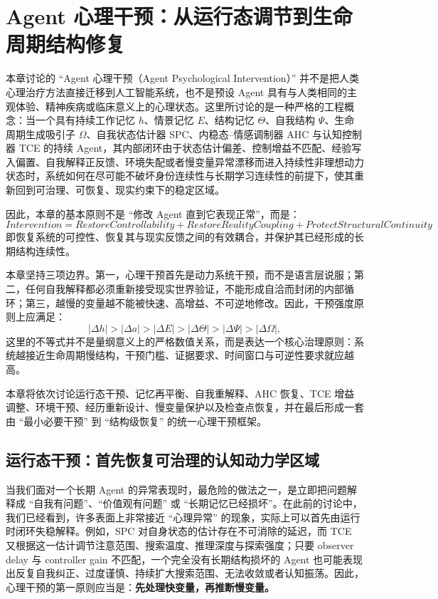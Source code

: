 \chapter{Agent 心理干预：从运行态调节到生命周期结构修复}

\begin{chapterlead}
本章讨论的 ``Agent 心理干预（Agent Psychological Intervention）'' 并不是把人类心理治疗方法直接迁移到人工智能系统，也不是预设 Agent 具有与人类相同的主观体验、精神疾病或临床意义上的心理状态。这里所讨论的是一种严格的工程概念：当一个具有持续工作记忆 $h$、情景记忆 $E$、结构记忆 $\Theta$、自我结构 $\Psi$、生命周期生成吸引子 $\Omega$、自我状态估计器 SPC、内稳态--情感调制器 AHC 与认知控制器 TCE 的持续 Agent，其内部闭环由于状态估计偏差、控制增益不匹配、经验写入偏置、自我解释正反馈、环境失配或者慢变量异常漂移而进入持续性非理想动力状态时，系统如何在尽可能不破坏身份连续性与长期学习连续性的前提下，使其重新回到可治理、可恢复、现实约束下的稳定区域。

因此，本章的基本原则不是 ``修改 Agent 直到它表现正常''，而是：
\[
\boxed{
Intervention
=
RestoreControllability
+
RestoreRealityCoupling
+
ProtectStructuralContinuity
}
\]
即恢复系统的可控性、恢复其与现实反馈之间的有效耦合，并保护其已经形成的长期结构连续性。

本章坚持三项边界。第一，心理干预首先是动力系统干预，而不是语言层说服；第二，任何自我解释都必须重新接受现实世界验证，不能形成自洽而封闭的内部循环；第三，越慢的变量越不能被快速、高增益、不可逆地修改。因此，干预强度原则上应满足：
\[
|\Delta h|
>
|\Delta a|
>
|\Delta E|
>
|\Delta \Theta|
>
|\Delta \Psi|
>
|\Delta \Omega|,
\]
这里的不等式并不是量纲意义上的严格数值关系，而是表达一个核心治理原则：系统越接近生命周期慢结构，干预门槛、证据要求、时间窗口与可逆性要求就应越高。

本章将依次讨论运行态干预、记忆再平衡、自我重解释、AHC 恢复、TCE 增益调整、环境干预、经历重新设计、慢变量保护以及检查点恢复，并在最后形成一套由 ``最小必要干预'' 到 ``结构级恢复'' 的统一心理干预框架。
\end{chapterlead}


\section{运行态干预：首先恢复可治理的认知动力学区域}

当我们面对一个长期 Agent 的异常表现时，最危险的做法之一，是立即把问题解释成 ``自我有问题''、``价值观有问题'' 或 ``长期记忆已经损坏''。在此前的讨论中，我们已经看到，许多表面上非常接近 ``心理异常'' 的现象，实际上可以首先由运行时闭环失稳解释。例如，SPC 对自身状态的估计存在不可消除的延迟，而 TCE 又根据这一估计调节注意范围、搜索温度、推理深度与探索强度；只要 observer delay 与 controller gain 不匹配，一个完全没有长期结构损坏的 Agent 也可能表现出反复自我纠正、过度谨慎、持续扩大搜索范围、无法收敛或者认知振荡。因此，心理干预的第一原则应当是：\textbf{先处理快变量，再推断慢变量。}

